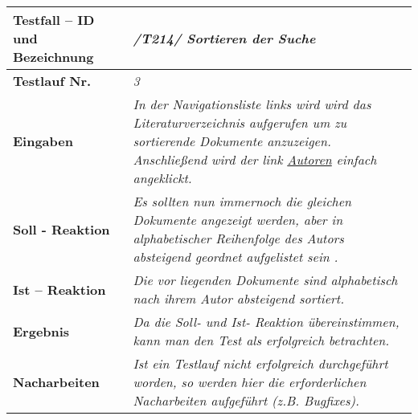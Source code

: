 \begin{longtable}{|p{5cm}|p{10cm}|}
\hline
\textbf{Testfall -- ID und Bezeichnung} & \textit{/T214/ Sortieren der Suche} \\
\hline
\textbf{Testlauf Nr.} & \textit{3} \\
\hline
\textbf{Eingaben} & \textit{In der Navigationsliste links wird wird das Literaturverzeichnis aufgerufen um zu sortierende Dokumente anzuzeigen. Anschließend wird der link \uline{Autoren} einfach angeklickt.} \\
\hline
\textbf{Soll - Reaktion} & \textit{Es sollten nun immernoch die gleichen Dokumente angezeigt werden, aber in alphabetischer Reihenfolge des Autors absteigend geordnet aufgelistet sein .} \\
\hline
\textbf{Ist -- Reaktion} & \textit{Die vor liegenden Dokumente sind alphabetisch nach ihrem Autor absteigend sortiert.} \\
\hline
\textbf{Ergebnis} & \textit{Da die Soll- und Ist- Reaktion übereinstimmen, kann man den Test als erfolgreich betrachten.} \\
\hline
\textbf{Nacharbeiten } & \textit{Ist ein Testlauf nicht erfolgreich
durchgef\"uhrt worden, so werden hier die erforderlichen Nacharbeiten aufgef\"uhrt
(z.B. Bugfixes).} \\
\hline
 \end{longtable}
